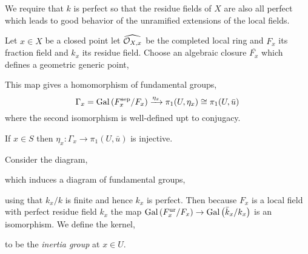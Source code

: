 \documentclass[12pt]{article}
\begin{document}
\begin{rmk}
We require that $k$ is perfect so that the residue fields of $X$ are also all perfect which leads to good behavior of the unramified extensions of the local fields.
\end{rmk}

\begin{defn}
Let $x \in X$ be a closed point let $\widehat{\mathcal{O}_{X, x}}$ be the completed local ring and $F_x$ its fraction field and $k_x$ its residue field. Choose an algebraic closure $\overline{F_x}$ which defines a geometric generic point,
\begin{center}
\end{center}
This map gives a homomorphism of fundamental groups,
\[ \Gamma_x = \mathrm{Gal}\left( F_x^{\mathrm{sep}} / F_x \right) \xrightarrow{\eta_x} \pi_1(U, \eta_x) \cong \pi_1(U, \bar{u}) \]
where the second isomorphism is well-defined upt to conjugacy. 
\end{defn}

\begin{prop}
If $x \in S$ then $\eta_x : \Gamma_x \to \pi_1(U, \bar{u})$ is injective.
\end{prop}

\begin{defn}
Consider the diagram,
\begin{center}
\end{center}
which induces a diagram of fundamental groups,
\begin{center}
\end{center}
using that $k_x / k$ is finite and hence $k_x$ is perfect. Then because $F_x$ is a local field with perfect residue field $k_x$ the map $\mathrm{Gal}\left( F_x^{\mathrm{ur}}/F_x \right) \to \mathrm{Gal}\left( \bar{k}_x / k_x \right)$ is an isomorphism. We define the kernel,
\begin{center}
\end{center} 
to be the \textit{inertia group} at $x \in U$. 
\end{defn}
\end{document}

